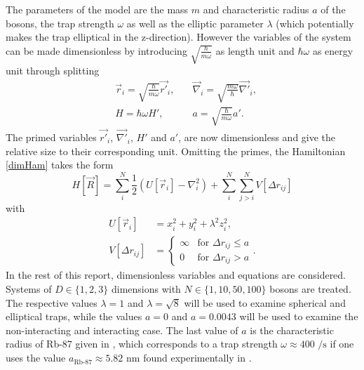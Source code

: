 \documentclass[a4paper,8pt]{article}
\begin{document}
\begin{multicols}{2}
The parameters of the model are the mass $m$ and characteristic radius $a$ of the bosons, the trap strength $\omega$ as well as the elliptic parameter $\lambda$ (which potentially makes the trap elliptical in the z-direction). However the variables of the system can be made dimensionless by introducing $\sqrt{\frac{\hbar}{m\omega}}$ as length unit and $\hbar\omega$ as energy unit through splitting
\begin{align}
&\vec{r}_i = \sqrt{\frac{\hbar}{m\omega}}\vec{r'}_i, \quad &\vec{\nabla}_i = \sqrt{\frac{m\omega}{\hbar}}\vec{\nabla'}_i, \nonumber\\
&H = \hbar\omega H', \quad\quad &a = \sqrt{\frac{\hbar}{m\omega}}a'. \nonumber
\end{align}
The primed variables $\vec{r'}_i$, $\vec{\nabla'}_i$, $H'$ and $a'$, are now dimensionless and give the relative size to their corresponding unit. Omitting the primes, the Hamiltonian \eqref{dimHam} takes the form
\begin{equation}\label{Ham}
H[\vec{R}] = \sum\limits_i^N \frac{1}{2}\left( U[\vec{r}_i] - {\nabla}_i^2\right) + \sum\limits_i^N\sum\limits_{j > i}^N V[\Delta{r}_{ij}]
\end{equation}
with
\begin{align}
U[\vec{r}_i] &= x_i^2+y_i^2+\lambda^2z_i^2, \label{U}\\
V[\Delta{r}_{ij}] &=\begin{cases} \infty & \text{for $\Delta{r}_{ij} \leq a$} \\
0 & \text{for $\Delta{r}_{ij} > a$} \end{cases}. \label{V}
\end{align}
In the rest of this report, dimensionless variables and equations are considered. Systems of $D \in \{1,2,3\}$ dimensions with $N \in \{1,10,50,100\}$ bosons are treated. The respective values $\lambda = 1$ and $\lambda = \sqrt{8}$ will be used to examine spherical and elliptical traps, while the values $a = 0$ and $a = 0.0043$ will be used to examine the non-interacting and interacting case. The last value of $a$ is the characteristic radius of Rb-87 given in \cite{DBG}, which corresponds to a trap strength $\omega \approx 400\text{ /s}$ if one uses the value $a_\text{Rb-87} \approx 5.82\text{ nm}$ found experimentally in \cite{BTGHV}.



\end{multicols}
\end{document}
